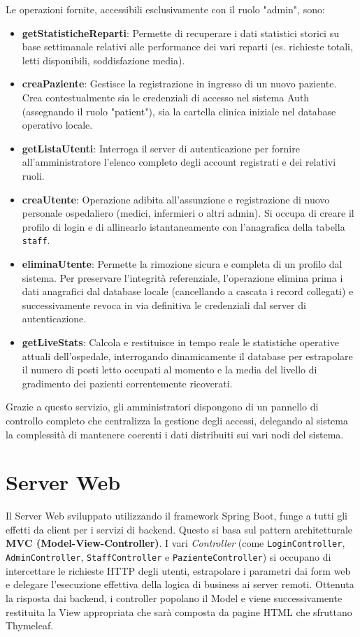 Le operazioni fornite, accessibili esclusivamente con il ruolo "admin", sono:
\begin{itemize}
    \item \textbf{getStatisticheReparti}: Permette di recuperare i dati statistici storici su base settimanale relativi alle performance dei vari reparti (es. richieste totali, letti disponibili, soddisfazione media).
    \item \textbf{creaPaziente}: Gestisce la registrazione in ingresso di un nuovo paziente. Crea contestualmente sia le credenziali di accesso nel sistema Auth (assegnando il ruolo "patient"), sia la cartella clinica iniziale nel database operativo locale.
    \item \textbf{getListaUtenti}: Interroga il server di autenticazione per fornire all'amministratore l'elenco completo degli account registrati e dei relativi ruoli.
    \item \textbf{creaUtente}: Operazione adibita all'assunzione e registrazione di nuovo personale ospedaliero (medici, infermieri o altri admin). Si occupa di creare il profilo di login e di allinearlo istantaneamente con l'anagrafica della tabella \texttt{staff}.
    \item \textbf{eliminaUtente}: Permette la rimozione sicura e completa di un profilo dal sistema. Per preservare l'integrità referenziale, l'operazione elimina prima i dati anagrafici dal database locale (cancellando a cascata i record collegati) e successivamente revoca in via definitiva le credenziali dal server di autenticazione.
    \item \textbf{getLiveStats}: Calcola e restituisce in tempo reale le statistiche operative attuali dell'ospedale, interrogando dinamicamente il database per estrapolare il numero di posti letto occupati al momento e la media del livello di gradimento dei pazienti correntemente ricoverati.
\end{itemize}

Grazie a questo servizio, gli amministratori dispongono di un pannello di controllo completo che centralizza la gestione degli accessi, delegando al sistema la complessità di mantenere coerenti i dati distribuiti sui vari nodi del sistema.

\section{Server Web}
Il Server Web sviluppato utilizzando il framework Spring Boot, funge a tutti gli effetti da client per i servizi di backend. Questo si basa sul pattern architetturale \textbf{MVC (Model-View-Controller)}. I vari \textit{Controller} (come \texttt{LoginController}, \texttt{AdminController}, \texttt{StaffController} e \texttt{PazienteController}) si occupano di intercettare le richieste HTTP degli utenti, estrapolare i parametri dai form web e delegare l'esecuzione effettiva della logica di business ai server remoti. Ottenuta la risposta dai backend, i controller popolano il Model e viene successivamente restituita la View appropriata che sarà composta da pagine HTML che sfruttano Thymeleaf.

